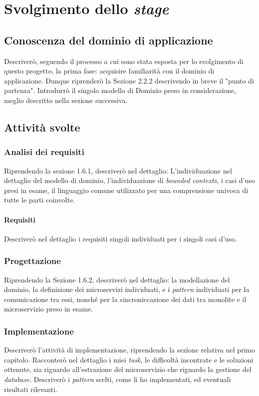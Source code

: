\chapter{Svolgimento dello \textit{stage}}
    \section{Conoscenza del dominio di applicazione}
    Descriverò, seguendo il processo a cui sono stata esposta per lo svolgimento di questo progetto, la prima fase: acquisire familiarità con il dominio di applicazione. Dunque riprenderò la Sezione 2.2.2 descrivendo in breve il "punto di partenza". Introdurrò il singolo modello di Dominio preso in considerazione, meglio descritto nella sezione successiva. 
    \section{Attività svolte}
        \subsection{Analisi dei requisiti}
        Riprendendo la sezione 1.6.1, descriverò nel dettaglio: L'individuazione nel dettaglio del modello di dominio, l'individuazione di \textit{bounded contexts}, i casi d'uso presi in esame, il linguaggio comune utilizzato per una comprensione univoca di tutte le parti coinvolte. 
            \subsubsection{Requisiti}
            Descriverò nel dettaglio i requisiti singoli individuati per i singoli casi d'uso.
        \subsection{Progettazione}
        Riprendendo la Sezione 1.6.2, descriverò nel dettaglio: la modellazione del dominio, la definizione dei microservizi individuati, e i \textit{pattern} individuati per la comunicazione tra essi, nonché per la sincroniccazione dei dati tra monolite e il microservizio preso in esame.
        \subsection{Implementazione}
        Descriverò l'attività di implementazione, riprendendo la sezione relativa nel primo capitolo. 
        Racconterò nel dettaglio i miei \textit{task}, le difficoltà incontrate e le soluzioni ottenute, sia riguardo all'estrazione del microservizio che riguardo la gestione del \textit{database}. 
        Descriverò i \textit{pattern} scelti, come li ho implementati, ed eventuali risultati rilevanti. 
